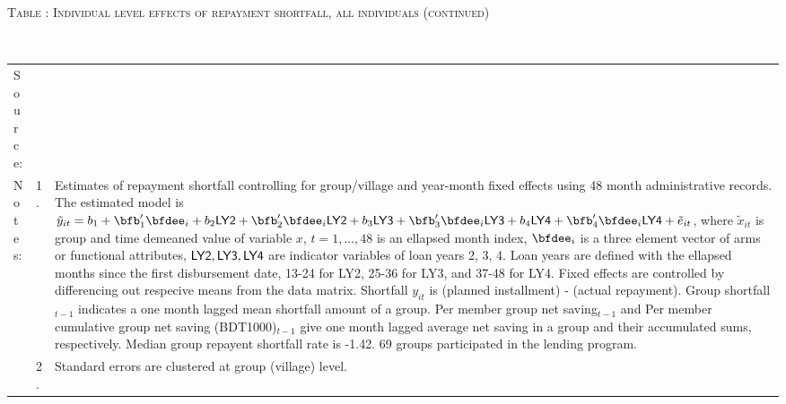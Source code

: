 \addtocounter{table}{-1}
\hspace{-1cm}\begin{minipage}[t]{14cm}
\hfil\textsc{\normalsize Table \thetable: Individual level effects of repayment shortfall, all individuals (continued)\label{tab shortfall indiv3}}\\
\setlength{\tabcolsep}{1pt}
\setlength{\baselineskip}{8pt}
\renewcommand{\arraystretch}{.6}
\hfil{}\\
\renewcommand{\arraystretch}{.8}
\setlength{\tabcolsep}{1pt}
\begin{tabular}{>{\hfill\scriptsize}p{1cm}<{}>{\hfill\scriptsize}p{.25cm}<{}>{\scriptsize}p{12cm}<{\hfill}}
Source:& \multicolumn{2}{l}{\scriptsize Estimated with GUK administrative data.}\\
Notes: & 1. & Estimates of repayment shortfall controlling for group/village and year-month fixed effects using 48 month administrative records. The estimated model is $\tilde{y}_{it}=b_{1}+\bfb'_{1}\bfdee_{i}+b_{2}\mbox{\textsf{LY2}}+\bfb'_{2}\bfdee_{i}\mbox{\textsf{LY2}}+b_{3}\mbox{\textsf{LY3}}+\bfb'_{3}\bfdee_{i}\mbox{\textsf{LY3}}+b_{4}\mbox{\textsf{LY4}}+\bfb'_{4}\bfdee_{i}\mbox{\textsf{LY4}}+\tilde{e}_{it}$, where $\tilde{x}_{it}$ is group and time demeaned value of variable $x$, $t=1,\dots, 48$ is an ellapsed month index, $\bfdee_{i}$ is a three element vector of arms or functional attributes, $\mbox{\textsf{LY2}}, \mbox{\textsf{LY3}}, \mbox{\textsf{LY4}}$ are indicator variables of loan years 2, 3, 4. Loan years are defined with the ellapsed months since the first disbursement date, 13-24 for \textsf{LY2}, 25-36 for \textsf{LY3}, and 37-48 for \textsf{LY4}. Fixed effects are controlled by differencing out respecive means from the data matrix. Shortfall $y_{it}$ is (planned installment) - (actual repayment). \textsf{Group shortfall}$_{t-1}$ indicates a one month lagged mean shortfall amount of a group. \textsf{Per member group net saving}$_{t-1}$ and \textsf{Per member cumulative group net saving (BDT1000)}$_{t-1}$ give one month lagged average net saving in a group and their accumulated sums, respectively. Median group repayent shortfall rate is -1.42. 69 groups participated in the lending program. \\
& 2. & Standard errors are clustered at group (village) level.
\end{tabular}
\end{minipage}

